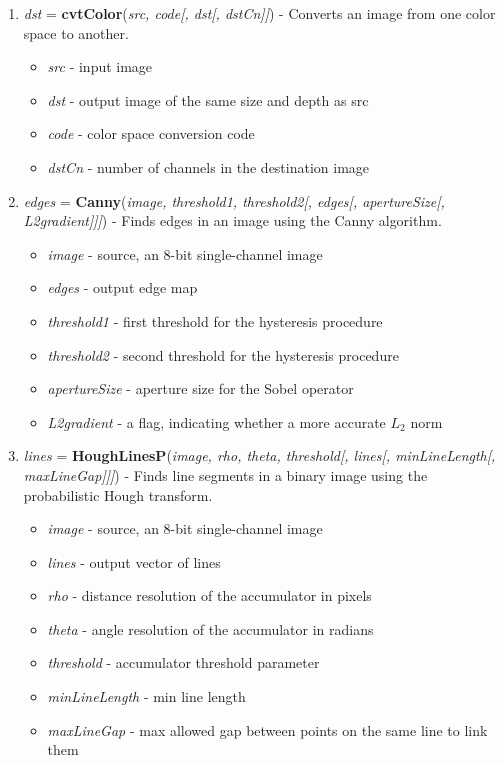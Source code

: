 \begin{enumerate}
	\item \textit{dst} = \textbf{cvtColor}(\textit{src, code[, dst[, dstCn]]}) - Converts an image from one color space to another. \small{\begin{itemize}
		\item \textit{src} - input image
		\item \textit{dst} - output image of the same size and depth as src
		\item \textit{code} - color space conversion code
		\item \textit{dstCn} - number of channels in the destination image
	\end{itemize}}
	\item \textit{edges} = \textbf{Canny}(\textit{image, threshold1, threshold2[, edges[, apertureSize[, L2gradient]]]}) - Finds edges in an image using the Canny algorithm. \small{\begin{itemize}
		\item \textit{image} - source, an 8-bit single-channel image
		\item \textit{edges} - output edge map
		\item \textit{threshold1} - first threshold for the hysteresis procedure
		\item \textit{threshold2} - second threshold for the hysteresis procedure
		\item \textit{apertureSize} - aperture size for the Sobel operator
		\item \textit{L2gradient} - a flag, indicating whether a more accurate $L_2$ norm
	\end{itemize}}
	\item \textit{lines} = \textbf{HoughLinesP}(\textit{image, rho, theta, threshold[, lines[, minLineLength[, maxLineGap]]]}) - Finds line segments in a binary image using the probabilistic Hough transform. \small{\begin{itemize}
		\item \textit{image} - source, an 8-bit single-channel image
		\item \textit{lines} - output vector of lines
		\item \textit{rho} - distance resolution of the accumulator in pixels
		\item \textit{theta} - angle resolution of the accumulator in radians
		\item \textit{threshold} - accumulator threshold parameter
		\item \textit{minLineLength} - min line length
		\item \textit{maxLineGap} - max allowed gap between points on the same line to link them	
	\end{itemize}}
\end{enumerate}

